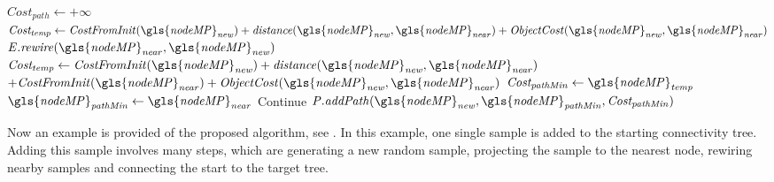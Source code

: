\begin{algorithm}[H]
\begin{algorithmic}[1]
{{\hspace{-0.1cm}\colorbox{my_green}{\parbox{\linewidth}{%
    \State $\mathit{Cost_{path}} \leftarrow +\infty$ 
    \State $\mathit{Cost_{temp}} \leftarrow \mathit{CostFromInit(\gls{nodeMP}_{new}) + distance(\gls{nodeMP}_{new}, \gls{nodeMP}_{near}) + ObjectCost(\gls{nodeMP}_{new}, \gls{nodeMP}_{near})}$
    \State $\mathit{E.rewire(\gls{nodeMP}_{near}, \gls{nodeMP}_{new})}$
           \EndIf
        \EndIf
      \Else {}
      \State $\mathit{Cost_{temp} \leftarrow CostFromInit(\gls{nodeMP}_{new}) + distance(\gls{nodeMP}_{new}, \gls{nodeMP}_{near})} $ \newline\hspace*{10em} $+ \mathit{CostFromInit(\gls{nodeMP}_{near}) + ObjectCost(\gls{nodeMP}_{new}, \gls{nodeMP}_{near})}$
          \State $\mathit{Cost_{pathMin} \leftarrow \gls{nodeMP}_{temp}}$
          \State $\mathit{\gls{nodeMP}_{pathMin} \leftarrow \gls{nodeMP}_{near}}$
              \EndIf
          \EndIf
      \EndIf
          \State Continue
      \Else
      \State $\mathit{P.addPath(\gls{nodeMP}_{new}, \gls{nodeMP}_{pathMin}, Cost_{pathMin})}$
      \EndIf
    \EndFor
}}
\EndWhile
}}
\end{algorithmic}
\end{algorithm}

\newpage
Now an example is provided of the proposed algorithm, see . In this example, one single sample is added to the starting connectivity tree. Adding this sample involves many steps, which are generating a new random sample, projecting the sample to the nearest node, rewiring nearby samples and connecting the start to the target tree.\bs

